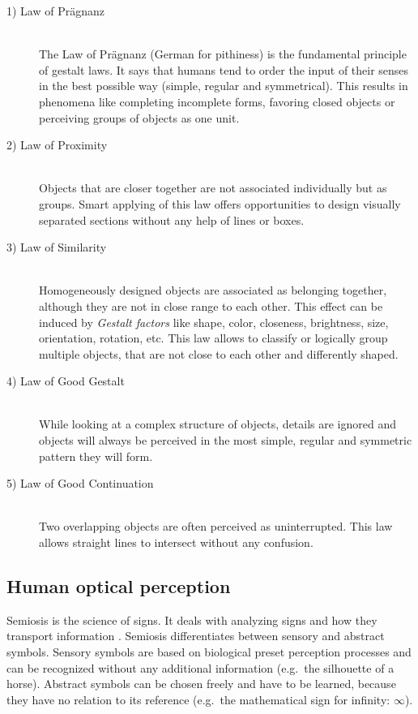 \documentclass[twoside, openright, 12pt]{book}
\begin{document}
\begin{description}
\item[1) Law of Prägnanz]\hfill \\
The Law of Prägnanz (German for pithiness) is the fundamental principle of gestalt laws.
It says that humans tend to order the input of their senses in the best possible way (simple, regular and symmetrical).
This results in phenomena like completing incomplete forms, favoring closed objects or perceiving groups of objects as one unit.

\item[2) Law of Proximity]\hfill \\
Objects that are closer together are not associated individually but as groups.
Smart applying of this law offers opportunities to design visually separated sections without any help of lines or boxes.

\item[3) Law of Similarity]\hfill \\
Homogeneously designed objects are associated as belonging together, although they are not in close range to each other.
This effect can be induced by \textit{Gestalt factors} like shape, color, closeness, brightness, size, orientation, rotation, etc.
This law allows to classify or logically group multiple objects, that are not close to each other and differently shaped.

\item[4) Law of Good Gestalt]\hfill \\
While looking at a complex structure of objects, details are ignored and objects will always be perceived in the most simple, regular and symmetric pattern they will form.

\item[5) Law of Good Continuation]\hfill \\
Two overlapping objects are often perceived as uninterrupted.
This law allows straight lines to intersect without any confusion.
\end{description}



\subsection{Human optical perception}
\label{human_optical_perception}
Semiosis is the science of signs.
It deals with analyzing signs and how they transport information \citep{Zeckzer14a}.
Semiosis differentiates between sensory and abstract symbols.
Sensory symbols are based on biological preset perception processes and can be recognized without any additional information (e.g.~the silhouette of a horse).
Abstract symbols can be chosen freely and have to be learned, because they have no relation to its reference (e.g.~the mathematical sign for infinity: $\infty$).
\end{document}
